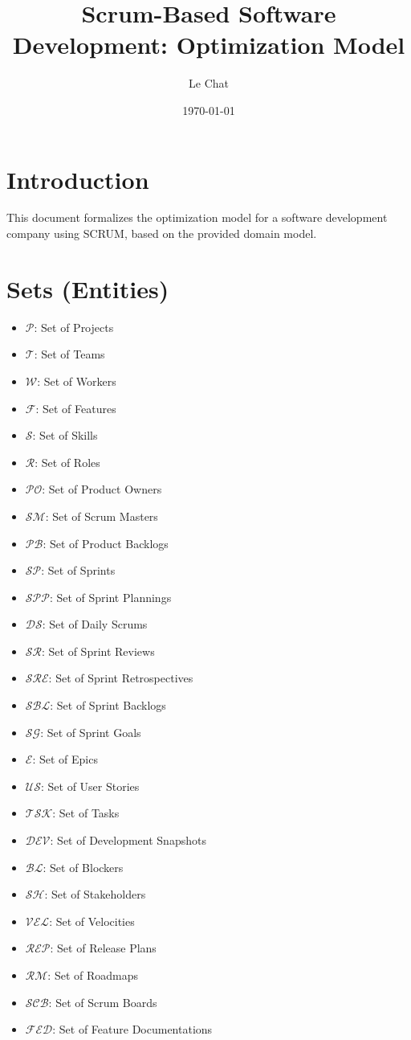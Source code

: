 \documentclass{article}
\title{Scrum-Based Software Development: Optimization Model}
\author{Le Chat}
\date{\today}
\begin{document}
\maketitle
\tableofcontents

\section{Introduction}
This document formalizes the optimization model for a software development company using SCRUM, based on the provided domain model.

\section{Sets (Entities)}
\begin{itemize}
    \item $\mathcal{P}$: Set of Projects
    \item $\mathcal{T}$: Set of Teams
    \item $\mathcal{W}$: Set of Workers
    \item $\mathcal{F}$: Set of Features
    \item $\mathcal{S}$: Set of Skills
    \item $\mathcal{R}$: Set of Roles
    \item $\mathcal{PO}$: Set of Product Owners
    \item $\mathcal{SM}$: Set of Scrum Masters
    \item $\mathcal{PB}$: Set of Product Backlogs
    \item $\mathcal{SP}$: Set of Sprints
    \item $\mathcal{SPP}$: Set of Sprint Plannings
    \item $\mathcal{DS}$: Set of Daily Scrums
    \item $\mathcal{SR}$: Set of Sprint Reviews
    \item $\mathcal{SRE}$: Set of Sprint Retrospectives
    \item $\mathcal{SBL}$: Set of Sprint Backlogs
    \item $\mathcal{SG}$: Set of Sprint Goals
    \item $\mathcal{E}$: Set of Epics
    \item $\mathcal{US}$: Set of User Stories
    \item $\mathcal{TSK}$: Set of Tasks
    \item $\mathcal{DEV}$: Set of Development Snapshots
    \item $\mathcal{BL}$: Set of Blockers
    \item $\mathcal{SH}$: Set of Stakeholders
    \item $\mathcal{VEL}$: Set of Velocities
    \item $\mathcal{REP}$: Set of Release Plans
    \item $\mathcal{RM}$: Set of Roadmaps
    \item $\mathcal{SCB}$: Set of Scrum Boards
    \item $\mathcal{FED}$: Set of Feature Documentations
\end{itemize}
\end{document}
